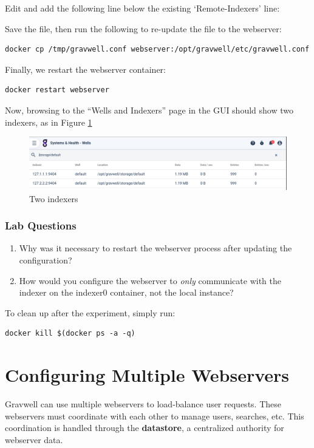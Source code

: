 Edit  and add the following line below the existing `Remote-Indexers' line:


Save the file, then run the following to re-update the file to the webserver:

\begin{Verbatim}[breaklines=true]
docker cp /tmp/gravwell.conf webserver:/opt/gravwell/etc/gravwell.conf
\end{Verbatim}

Finally, we restart the webserver container:

\begin{Verbatim}[breaklines=true]
docker restart webserver
\end{Verbatim}

Now, browsing to the ``Wells and Indexers'' page in the GUI should show
two indexers, as in Figure \ref{fig:twoindexers}

\begin{figure}
	\includegraphics{images/twoindexers.png}
	\caption{Two indexers}
	\label{fig:twoindexers}
\end{figure}

\subsubsection{Lab Questions}

\begin{enumerate}
\item
  Why was it necessary to restart the webserver process after updating
  the configuration?
\item
  How would you configure the webserver to \emph{only} communicate with
  the indexer on the indexer0 container, not the local instance?
\end{enumerate}

To clean up after the experiment, simply run:

\begin{Verbatim}[breaklines=true]
docker kill $(docker ps -a -q)
\end{Verbatim}

\section{Configuring Multiple Webservers}
Gravwell can use multiple webservers to load-balance user requests.
These webservers must coordinate with each other to manage users,
searches, etc. This coordination is handled through the \textbf{datastore}, a
centralized authority for webserver data.


